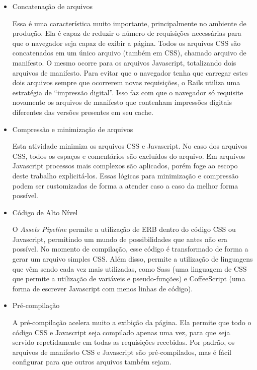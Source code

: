 \begin{itemize}
\item Concatenação de arquivos

Essa é uma característica muito importante, principalmente no ambiente de produção. Ela é capaz de reduzir o número de requisições necessárias para que o navegador seja capaz de exibir a página. Todos os arquivos CSS são concatenados em um único arquivo (também em CSS), chamado arquivo de manifesto. O mesmo ocorre para os arquivos Javascript, totalizando dois arquivos de manifesto. Para evitar que o navegador tenha que carregar estes dois arquivos sempre que ocorrerem novas requisições, o Rails utiliza uma estratégia de ``impressão digital''. Isso faz com que o navegador só requisite novamente os arquivos de manifesto que contenham impressões digitais diferentes das versões presentes em seu cache.

\item Compressão e minimização de arquivos

Esta atividade minimiza os arquivos CSS e Javascript. No caso dos arquivos CSS, todos os espaços e comentários são excluídos do arquivo. Em arquivos Javascript processos mais complexos são aplicados, porém foge ao escopo deste trabalho explicitá-los. Essas lógicas para minimização e compressão podem ser customizadas de forma a atender caso a caso da melhor forma possível.

\item Código de Alto Nível

O \textit{Assets Pipeline} permite a utilização de ERB dentro do código CSS ou Javascript, permitindo um mundo de possibilidades que antes não era possível. No momento de compilação, esse código é transformado de forma a gerar um arquivo simples CSS. Além disso, permite a utilização de linguagens que vêm sendo cada vez mais utilizadas, como Sass (uma linguagem de CSS que permite a utilização de variáveis e pseudo-funções) e CoffeeScript (uma forma de escrever Javascript com menos linhas de código).

\item Pré-compilação

A pré-compilação acelera muito a exibição da página. Ela permite que todo o código CSS e Javascript seja compilado apenas uma vez, para que seja servido repetidamente em todas as requisições recebidas. Por padrão, os arquivos de manifesto CSS e Javascript são pré-compilados, mas é fácil configurar para que outros arquivos também sejam.
\end{itemize}

